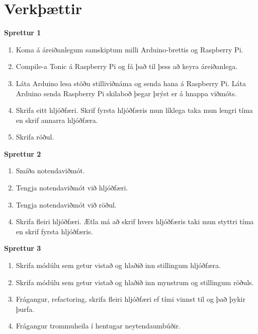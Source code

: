 \documentclass[a4paper,11pt,twocolumn]{article}
\begin{document}
\section{Verkþættir}
\textbf{Sprettur 1}
\begin{enumerate}
	\item Koma á áreiðanlegum samskiptum milli Arduino-brettis og Raspberry Pi.
	\item Compile-a Tonic á Raspberry Pi og fá það til þess að keyra áreiðanlega.
    \item Láta Arduino lesa stöðu stilliviðnáma og senda hana á Raspberry Pi. Láta Arduino senda Raspberry Pi skilaboð þegar þrýst er á hnappa viðmóts.
	\item Skrifa eitt hljóðfæri. Skrif fyrsta hljóðfæris mun líklega taka mun lengri tíma en skrif annarra hljóðfæra.
	\item Skrifa röðul.
\end{enumerate}
\textbf{Sprettur 2}
\begin{enumerate}
	\item Smíða notendaviðmót.
	\item Tengja notendaviðmót við hljóðfæri.
    \item Tengja notendaviðmót við röðul.
	\item Skrifa fleiri hljóðfæri. Ætla má að skrif hvers hljóðfæris taki mun styttri tíma en skrif fyrsta hljóðfæris.
\end{enumerate}
\pagebreak
\textbf{Sprettur 3}
\begin{enumerate}
	\item Skrifa módúlu sem getur vistað og hlaðið inn stillingum hljóðfæra.
	\item Skrifa módúlu sem getur vistað og hlaðið inn mynstrum og stillingum röðuls.
    \item Frágangur, refactoring, skrifa fleiri hljóðfæri ef tími vinnst til og það þykir þurfa.
	\item Frágangur trommuheila í hentugar neytendaumbúðir.
\end{enumerate}
\end{document}
